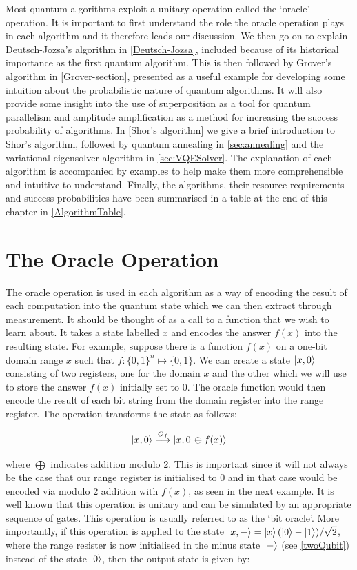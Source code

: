 Most quantum algorithms exploit a unitary operation called the `oracle' operation. It is important to first understand the role the oracle operation plays in each algorithm and it therefore leads our discussion. We then go on to explain Deutsch-Jozsa's algorithm in \autoref{Deutsch-Jozsa}, included because of its historical importance as the first quantum algorithm. This is then followed by Grover's algorithm in \autoref{Grover-section}, presented as a useful example for developing some intuition about the probabilistic nature of quantum algorithms. It will also provide some insight into the use of superposition as a tool for quantum parallelism and amplitude amplification as a method for increasing the success probability of algorithms. In \autoref{Shor's algorithm} we give a brief introduction to Shor's algorithm, followed by quantum annealing in \autoref{sec:annealing} and the variational eigensolver algorithm in \autoref{sec:VQESolver}. The explanation of each algorithm is accompanied by examples to help make them more comprehensible and intuitive to understand. Finally, the algorithms, their resource requirements and success probabilities have been summarised in a table at the end of this chapter in \autoref{AlgorithmTable}.  

\section{The Oracle Operation}\label{Oraclular gates}

The oracle operation is used in each algorithm as a way of encoding the result of each computation into the quantum state which we can then extract through measurement. It should be thought of as a call to a function that we wish to learn about. It takes a state labelled $x$ and encodes the answer $f(x)$ into the resulting state. For example, suppose there is a function $f(x)$ on a one-bit domain range $x$ such that $f:\{0,1\}^n\mapsto\{0,1\}$. We can create a state $\left\vert{x,0}\right\rangle$ consisting of two registers, one for the domain $x$ and the other which we will use to store the answer $f(x)$ initially set to $0$. The oracle function would then encode the result of each bit string from the domain register into the range register. The operation transforms the state as follows:

\begin{equation*}
    \left\vert{x,0}\right\rangle \overset{O_{f}}{\longrightarrow} \left\vert{x,0 \, \oplus f(x)}\right\rangle
\end{equation*} 

where $\bigoplus$ indicates addition modulo 2. This is important since it will not always be the case that our range register is initialised to $0$ and in that case would be encoded via modulo 2 addition with $f(x)$, as seen in the next example. It is well known that this operation is unitary and can be simulated by an appropriate sequence of gates. This operation is usually referred to as the `bit oracle'. More importantly, if this operation is applied to the state $\left\vert{x,-}\right\rangle=\left\vert{x}\right\rangle(\left\vert{0}\right\rangle-\left\vert{1}\right\rangle)/\sqrt{2}$, where the range resister is now initialised in the minus state $\left\vert{-}\right\rangle$ (see \autoref{twoQubit}) instead of the state $\left\vert{0}\right\rangle$, then the output state is given by:

